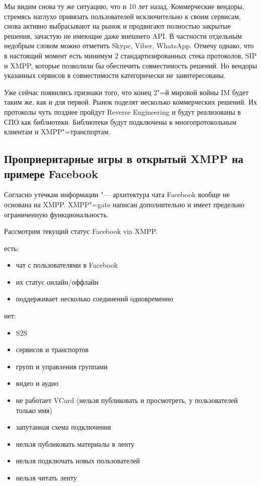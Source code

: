\documentclass[10pt, a5paper]{article}
\begin{document}
Мы видим снова ту же ситуацию, что и 10 лет назад. Коммерческие вендоры, стремясь наглухо привязать пользователей исключительно к своим сервисам, снова активно выбрасывают на рынок и продвигают полностью закрытые решения, зачастую не имеющие даже внешнего API. В частности отдельным недобрым словом можно отметить Skype, Viber, WhatsApp.  Отмечу однако, что в настоящий момент есть минимум 2 стандартизированных стека протоколов, SIP и XMPP, которые позволили бы обеспечить совместимость решений.  Но вендоры указанных сервисов в совместимости категорически не заинтересованы.

Уже сейчас появились признаки того, что конец 2"=й мировой войны IM будет таким же, как и для первой. Рынок поделят несколько коммерческих решений. Их  протоколы чуть позднее пройдут Reverse Engineering и будут реализованы в СПО как библиотеки. Библиотеки будут подключены  к многопротокольным клиентам и XMPP"=транспортам.

\subsection*{Проприеритарные игры в открытый XMPP на примере Facebook}

Согласно утечкам информации "--- архитектура чата Facebook вообще не основана на XMPP. XMPP"=gate написан дополнительно и имеет предельно ограниченную функциональность.

Рассмотрим текущий статус Facebook via XMPP.

есть:

\begin{itemize}
  \item чат с пользователями в Facebook
  \item их статус онлайн/оффлайн
  \item поддерживает несколько соединений одновременно
\end{itemize}

нет:

\begin{itemize}
  \item S2S
  \item сервисов и транспортов
  \item групп и управления группами
  \item видео и аудио
  \item не работает VCard (нельзя публиковать и просмотреть, у пользователей только имя)
  \item запутанная схема подключения
  \item нельзя публиковать материалы в ленту
  \item нельзя подключать новых пользователей
  \item нельзя читать ленту
\end{itemize}
\end{document}
